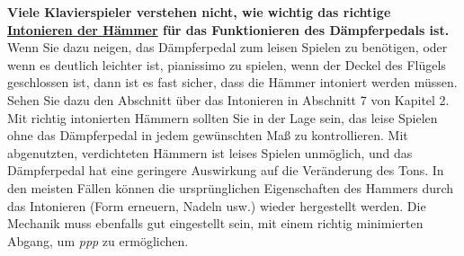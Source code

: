 \textbf{Viele Klavierspieler verstehen nicht, wie wichtig das richtige \hyperref[c2_7_hamm]{Intonieren der Hämmer} für das Funktionieren des Dämpferpedals ist.}
Wenn Sie dazu neigen, das Dämpferpedal zum leisen Spielen zu benötigen, oder wenn es deutlich leichter ist, pianissimo zu spielen, wenn der Deckel des Flügels geschlossen ist, dann ist es fast sicher, dass die Hämmer intoniert werden müssen.
Sehen Sie dazu den Abschnitt über das Intonieren in Abschnitt 7 von Kapitel 2.
Mit richtig intonierten Hämmern sollten Sie in der Lage sein, das leise Spielen ohne das Dämpferpedal in jedem gewünschten Maß zu kontrollieren.
Mit abgenutzten, verdichteten Hämmern ist leises Spielen unmöglich, und das Dämpferpedal hat eine geringere Auswirkung auf die Veränderung des Tons.
In den meisten Fällen können die ursprünglichen Eigenschaften des Hammers durch das Intonieren (Form erneuern, Nadeln usw.) wieder hergestellt werden.
Die Mechanik muss ebenfalls gut eingestellt sein, mit einem richtig minimierten Abgang, um \textit{ppp} zu ermöglichen.

